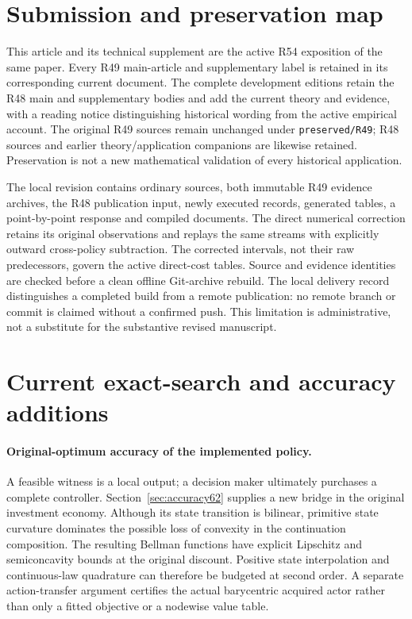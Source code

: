\documentclass[ecta,nameyear,draft]{econsocart}
\begin{document}
\section{Submission and preservation map}\label{sec:map49}
This article and its technical supplement are the active R54 exposition of the same paper. Every R49 main-article and supplementary label is retained in its corresponding current document. The complete development editions retain the R48 main and supplementary bodies and add the current theory and evidence, with a reading notice distinguishing historical wording from the active empirical account. The original R49 sources remain unchanged under \texttt{preserved/R49}; R48 sources and earlier theory/application companions are likewise retained. Preservation is not a new mathematical validation of every historical application.

The local revision contains ordinary sources, both immutable R49 evidence archives, the R48 publication input, newly executed records, generated tables, a point-by-point response and compiled documents. The direct numerical correction retains its original observations and replays the same streams with explicitly outward cross-policy subtraction. The corrected intervals, not their raw predecessors, govern the active direct-cost tables. Source and evidence identities are checked before a clean offline Git-archive rebuild. The local delivery record distinguishes a completed build from a remote publication: no remote branch or commit is claimed without a confirmed push. This limitation is administrative, not a substitute for the substantive revised manuscript.












\clearpage
\section*{Current exact-search and accuracy additions}
\setcounter{section}{0}
\renewcommand{\thesection}{R61.\arabic{section}}
\renewcommand{\theHsection}{R61.\arabic{section}}



\paragraph{Original-optimum accuracy of the implemented policy.}
A feasible witness is a local output; a decision maker ultimately purchases a complete controller. Section~\ref{sec:accuracy62} supplies a new bridge in the original investment economy. Although its state transition is bilinear, primitive state curvature dominates the possible loss of convexity in the continuation composition. The resulting Bellman functions have explicit Lipschitz and semiconcavity bounds at the original discount. Positive state interpolation and continuous-law quadrature can therefore be budgeted at second order. A separate action-transfer argument certifies the actual barycentric acquired actor rather than only a fitted objective or a nodewise value table.
\end{document}
